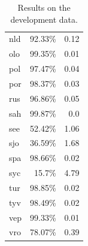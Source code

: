 \documentclass[11pt,a4paper]{article}
\newcommand\jp[1]{\textbf{JP: #1}}
\begin{document}
\begin{table}[ht!]
\begin{tabular}{lrr}
  nld & 92.33\% & 0.12 \\
  olo & 99.35\% & 0.01 \\
  pol & 97.47\% & 0.04 \\
  por & 98.37\% & 0.03 \\
  rus & 96.86\% & 0.05 \\
  sah & 99.87\% & 0.0 \\
  see & 52.42\% & 1.06 \\
  sjo & 36.59\% & 1.68 \\
  spa & 98.66\% & 0.02 \\
  syc & 15.7\% & 4.79 \\
  tur & 98.85\% & 0.02 \\
  tyv & 98.49\% & 0.02 \\
  vep & 99.33\% & 0.01 \\
  vro & 78.07\% & 0.39 \\
\end{tabular} 
\caption{Results on the development data.}
\label{tab:accuracy-dev}
\end{table}







\end{document}
